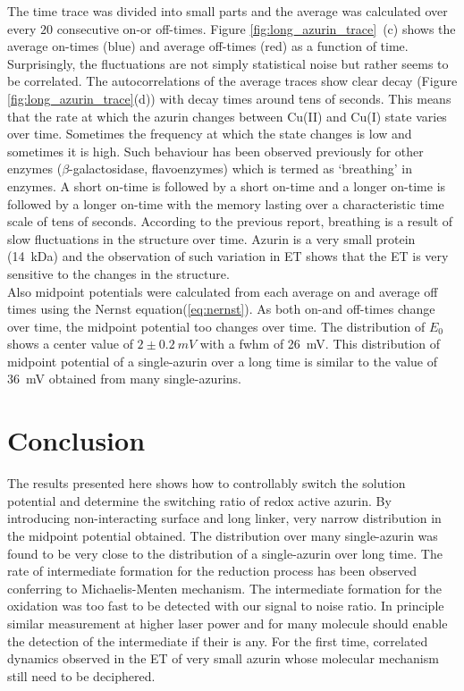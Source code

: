 \documentclass[journal=jacsat,manuscript=article]{achemso}
\begin{document}
The time trace was divided into small parts and the average was calculated over every $20$ consecutive on-or off-times. 
Figure \ref{fig:long_azurin_trace}~(c) shows the average on-times (blue) and average off-times (red) as a function of time.
Surprisingly, the fluctuations are not simply statistical noise but rather seems to be correlated. 
The autocorrelations of the average traces show clear decay (Figure \ref{fig:long_azurin_trace}(d)) with decay times around tens of seconds.
This means that the rate at which the azurin changes between Cu(II) and Cu(I) state varies over time.
Sometimes the frequency at which the state changes is low and sometimes it is high.
Such behaviour has been observed previously for other enzymes ($\beta$-galactosidase, flavoenzymes)\cite{lu1998single-molecule,kou2005single-molecule,english2006ever-fluctuating} which is termed as `breathing' in enzymes.
A short on-time is followed by a short on-time and a longer on-time is followed by a longer on-time with the memory lasting over a characteristic time scale of tens of seconds.
According to the previous report, breathing is a result of slow fluctuations in the structure over time.
Azurin is a very small protein (\SI{14}{kDa}) and the observation of such variation in ET shows that the ET is very sensitive to the changes in the structure.\\

Also midpoint potentials were calculated from each average on and average off times using the Nernst equation(\ref{eq:nernst}).
As both on-and off-times change over time, the midpoint potential too changes over time. 
The distribution of $E_0$ shows a center value of $2\pm0.2~mV$ with a fwhm of \SI{26}{\mV}.
This distribution of midpoint potential of a single-azurin over a long time is similar to the value of \SI{36}{\mV} obtained from many single-azurins.

\section{Conclusion}
The results presented here shows how to controllably switch the solution potential and determine the switching ratio of redox active azurin.
By introducing non-interacting surface and long linker, very narrow distribution in the midpoint potential obtained.
The distribution over many single-azurin was found to be very close to the distribution of a single-azurin over long time.
The rate of intermediate formation for the reduction process has been observed conferring to Michaelis-Menten mechanism.
The intermediate formation for the oxidation was too fast to be detected with our signal to noise ratio.
In principle similar measurement at higher laser power and for many molecule should enable the detection of the intermediate if their is any.
For the first time, correlated dynamics observed in the ET of very small azurin whose molecular mechanism still need to be deciphered.

% 
\pagebreak

\end{document}
